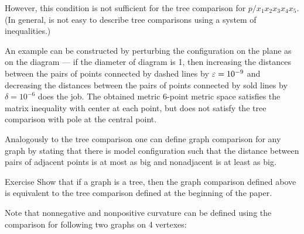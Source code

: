 \hide
\begin{wrapfigure}{r}{22 mm}
\vskip-20mm
\end{wrapfigure}

However, this condition is not sufficient for the tree comparison for $p/x_1x_2x_3x_4x_5$.
(In general, is not easy to describe tree comparisons using a system of inequalities.)

An example can be constructed by perturbing the configuration on the plane as on the diagram ---
if the diameter of diagram is 1, 
then increasing the distances between the pairs of points connected by dashed lines by $\varepsilon=10^{-9}$ and decreasing  the distances between the pairs of points connected by sold lines by $\delta=10^{-6}$ does the job.
The obtained metric 6-point metric space satisfies the matrix inequality with center at each point, but does not satisfy the tree comparison with pole at the central point.


Analogously to the tree comparison one can define graph comparison for any graph by stating that there is model configuration such that the distance between pairs of adjacent points is at most as big and nonadjacent is at least as big.

\begin{thm}{Exercise}
Show that if a graph is a tree, then the graph comparison defined above is equivalent to the tree comparison defined at the beginning of the paper.
\end{thm}


Note that nonnegative and nonpositive curvature can be defined using the comparison for following two graphs on 4 vertexes:

